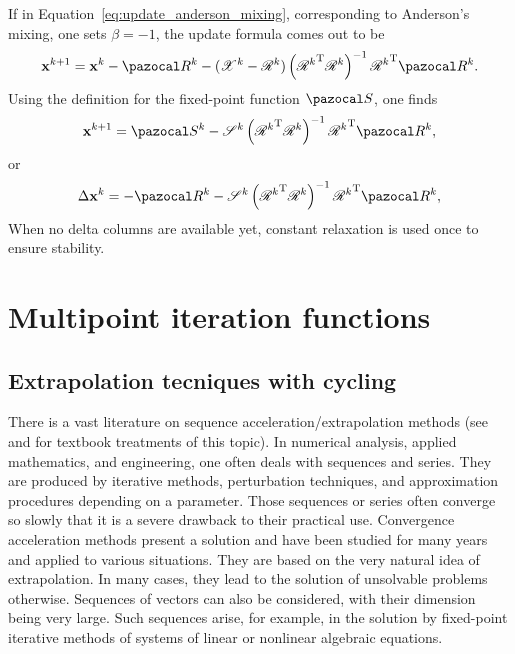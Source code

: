 If in Equation~\eqref{eq:update_anderson_mixing}, corresponding to Anderson's mixing, one sets \(\beta=-1\), the update formula comes out to be
\begin{equation}
  \mathbf x^{k+1} = \mathbf x^k - \pazocal R^k - (\mathscr X^k - \mathscr R^k)\left({\mathscr{R}^{k}}^{\mathrm{T}} \mathscr{R}^{k}\right)^{-1} {\mathscr{R}^{k}}^{\mathrm{T}} \pazocal R^{k}.
\end{equation}
Using the definition for the fixed-point function \(\pazocal S\), one finds
\begin{equation}
  \mathbf x^{k+1} = \pazocal S^k - \mathscr S^k\left({\mathscr{R}^{k}}^{\mathrm{T}} \mathscr{R}^{k}\right)^{-1} {\mathscr{R}^{k}}^{\mathrm{T}} \pazocal R^{k},
\end{equation}
or
\begin{equation}
  \Delta \mathbf x^{k} = - \pazocal R^k - \mathscr S^k\left({\mathscr{R}^{k}}^{\mathrm{T}} \mathscr{R}^{k}\right)^{-1} {\mathscr{R}^{k}}^{\mathrm{T}} \pazocal R^{k},
\end{equation}
When no delta columns are available yet, constant relaxation is used once to ensure stability.

\section{Multipoint iteration functions}

\subsection{Extrapolation tecniques with cycling}

There is a vast literature on sequence acceleration/extrapolation methods (see  \cite{brezinski_extrapolation_2013} and \cite{sidi_vector_2017} for textbook treatments of this topic).
In numerical analysis, applied mathematics, and engineering, one often deals with sequences and series.
They are produced by iterative methods, perturbation techniques, and approximation procedures depending on a parameter.
Those sequences or series often converge so slowly that it is a severe drawback to their practical use.
Convergence acceleration methods present a solution and have been studied for many years and applied to various situations.
They are based on the very natural idea of extrapolation.
In many cases, they lead to the solution of unsolvable problems otherwise.
Sequences of vectors can also be considered, with their dimension being very large.
Such sequences arise, for example, in the solution by fixed-point iterative methods of systems of linear or nonlinear algebraic equations.

